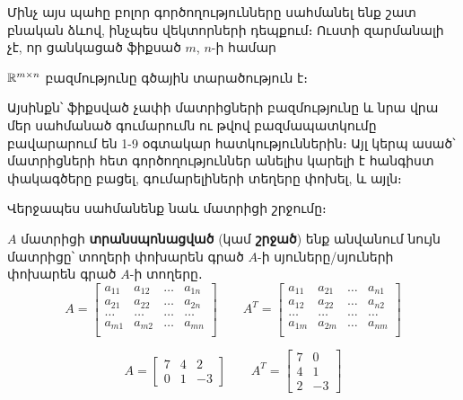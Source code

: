 
Մինչ այս պահը բոլոր գործողությունները սահմանել ենք շատ բնական ձևով, ինչպես վեկտորների դեպքում։ Ուստի զարմանալի չէ, որ ցանկացած ֆիքսած $m$, $n$-ի համար 
\begin{theorem}
$\mathbb{R}^{m \times n}$ բազմությունը գծային տարածություն է։
\end{theorem}
Այսինքն՝ ֆիքսված չափի մատրիցների բազմությունը և նրա վրա մեր սահմանած գումարումն ու թվով բազմապատկումը բավարարում են 1-9 օգտակար հատկություններին։ Այլ կերպ ասած՝ մատրիցների հետ գործողություններ անելիս կարելի է հանգիստ փակագծերը բացել, գումարելիների տեղերը փոխել, և այլն։


Վերջապես սահմանենք նաև մատրիցի շրջումը։

\begin{definition}
$A$ մատրիցի \textbf{տրանսպոնացված} (կամ \textbf{շրջած}) ենք անվանում նույն մատրիցը՝ տողերի փոխարեն գրած $A$-ի սյուները/սյուների փոխարեն գրած $A$-ի տողերը․ 
\[
A = \begin{bmatrix}
    a_{11} & a_{12} & \ldots & a_{1n} \\
    a_{21} & a_{22} & \ldots & a_{2n} \\
     \ldots & \ldots & \ldots & \ldots  \\
    a_{m1} & a_{m2} & \ldots & a_{mn} \\
  \end{bmatrix}\qquad A^T = \begin{bmatrix}
    a_{11} & a_{21} & \ldots & a_{n1} \\
    a_{12} & a_{22} & \ldots & a_{n2} \\
     \ldots & \ldots & \ldots & \ldots  \\
    a_{1m} & a_{2m} & \ldots & a_{nm} \\
  \end{bmatrix}
\]
\end{definition}

\begin{example}
\[
  A = \begin{bmatrix}
    7&4&2\\0&1&-3
  \end{bmatrix}\qquad
  A^T = \begin{bmatrix}
    7 & 0 \\
    4 & 1 \\
    2 & -3
  \end{bmatrix}
\]
\end{example}


